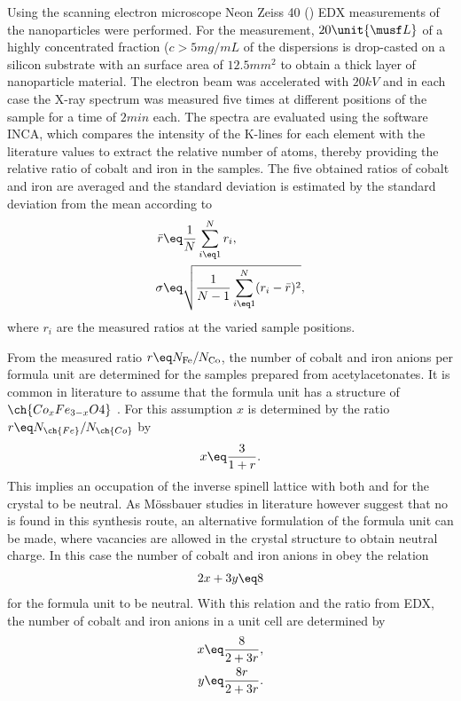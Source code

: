 \documentclass[\main/dresen_thesis.tex]{subfiles}
\begin{document}
    Using the scanning electron microscope Neon Zeiss 40 () EDX measurements of the nanoparticles were performed.
    For the measurement, $20 \unit{\musf L}$ of a highly concentrated fraction ($c > 5 \unit{mg/mL}$ of the dispersions is drop-casted on a silicon substrate with an surface area of $12.5 \unit{mm^2}$ to obtain a thick layer of nanoparticle material.
    The electron beam was accelerated with $20 \unit{kV}$ and in each case the X-ray spectrum was measured five times at different positions of the sample for a time of $2 \unit{min}$ each.
    The spectra are evaluated using the software INCA, which compares the intensity of the K-lines for each element with the literature values to extract the relative number of atoms, thereby providing the relative ratio of cobalt and iron in the samples.
    The five obtained ratios of cobalt and iron are averaged and the standard deviation is estimated by the standard deviation from the mean according to
    \begin{align}
      \bar{r} &\eq \frac{1}{N} \sum_{i \eq 1}^N r_i,\\
      \sigma &\eq \sqrt{\frac{1}{N-1} \sum_{i \eq 1}^N (r_i - \bar{r})^2},
    \end{align}
    where $r_i$ are the measured ratios at the varied sample positions.

    From the measured ratio $r \eq N_\mathrm{Fe} / N_\mathrm{Co}$, the number of cobalt and iron anions per formula unit are determined for the samples prepared from acetylacetonates.
    It is common in literature to assume that the formula unit has a structure of $\ch{Co_x Fe_{3-x} O4}$ \cite{Wu_2014_Monol, Sathya_2016_Cofeo}.
    For this assumption $x$ is determined by the ratio $r \eq N_{\ch{Fe}} / N_{\ch{Co}}$ by
    \begin{align}
      x \eq \frac{3}{1 + r}.
    \end{align}
    This implies an occupation of the inverse spinell lattice with both  and  for the crystal to be neutral.
    As M\"ossbauer studies in literature however suggest that no  is found in this synthesis route, an alternative formulation of the formula unit can be made, where vacancies are allowed in the crystal structure to obtain neutral charge.
    In this case the number of cobalt and iron anions in  obey the relation
    \begin{align}
      2 x + 3 y \eq 8
    \end{align}
    for the formula unit to be neutral.
    With this relation and the ratio from EDX, the number of cobalt and iron anions in a unit cell are determined by
    \begin{align}
      x \eq \frac{8}{2 + 3r},\\
      y \eq \frac{8r}{2 + 3r}.
    \end{align}
\end{document}
